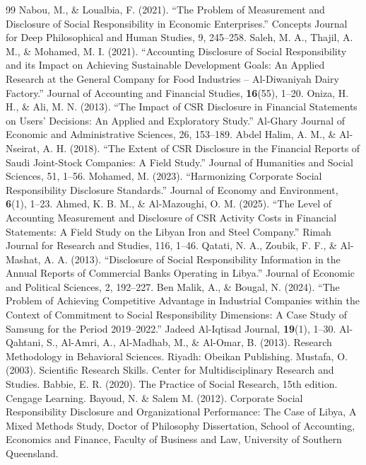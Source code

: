 \documentclass{NSP1}
\begin{document}
\begin{thebibliography}{99}
 Nabou, M., \& Loualbia, F. (2021). ``The Problem of Measurement and Disclosure of Social Responsibility in Economic Enterprises.'' Concepts Journal for Deep Philosophical and Human Studies, 9, 245--258.
 Saleh, M. A., Thajil, A. M., \& Mohamed, M. I. (2021). ``Accounting Disclosure of Social Responsibility and its Impact on Achieving Sustainable Development Goals: An Applied Research at the General Company for Food Industries -- Al-Diwaniyah Dairy Factory.'' Journal of Accounting and Financial Studies, \textbf{16}(55), 1--20.
 Oniza, H. H., \& Ali, M. N. (2013). ``The Impact of CSR Disclosure in Financial Statements on Users' Decisions: An Applied and Exploratory Study.'' Al-Ghary Journal of Economic and Administrative Sciences, 26, 153--189.
 Abdel Halim, A. M., \& Al-Nseirat, A. H. (2018). ``The Extent of CSR Disclosure in the Financial Reports of Saudi Joint-Stock Companies: A Field Study.'' Journal of Humanities and Social Sciences, 51, 1--56.
 Mohamed, M. (2023). ``Harmonizing Corporate Social Responsibility Disclosure Standards.'' Journal of Economy and Environment, \textbf{6}(1), 1--23.
 Ahmed, K. B. M., \& Al-Mazoughi, O. M. (2025). ``The Level of Accounting Measurement and Disclosure of CSR Activity Costs in Financial Statements: A Field Study on the Libyan Iron and Steel Company.'' Rimah Journal for Research and Studies, 116, 1--46.
 Qatati, N. A., Zoubik, F. F., \& Al-Mashat, A. A. (2013). ``Disclosure of Social Responsibility Information in the Annual Reports of Commercial Banks Operating in Libya.'' Journal of Economic and Political Sciences, 2, 192--227.
 Ben Malik, A., \& Bougal, N. (2024). ``The Problem of Achieving Competitive Advantage in Industrial Companies within the Context of Commitment to Social Responsibility Dimensions: A Case Study of Samsung for the Period 2019--2022.'' Jadeed Al-Iqtisad Journal, \textbf{19}(1), 1--30.
 Al-Qahtani, S., Al-Amri, A., Al-Madhab, M., \& Al-Omar, B. (2013). Research Methodology in Behavioral Sciences. Riyadh: Obeikan Publishing.
 Mustafa, O. (2003). Scientific Research Skills. Center for Multidisciplinary Research and Studies.
 Babbie, E. R. (2020). The Practice of Social Research, 15th edition. Cengage Learning.
 Bayoud, N. \& Salem M. (2012). Corporate Social Responsibility Disclosure and Organizational Performance: The Case of Libya, A Mixed Methods Study, Doctor of Philosophy Dissertation, School of Accounting, Economics and Finance, Faculty of Business and Law, University of Southern Queensland.

\end{thebibliography}
\end{document}
